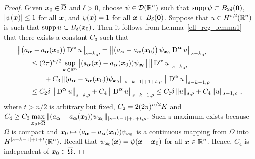 \begin{proof}
Given ${\bm{x}}_0 \in \overline{\Omega}$ and $\delta >0$,
choose $\displaystyle \psi \in \mathcal{D}(\mathbb{R}^n)$ such that
$\operatorname{supp} \psi \subset B_{2\delta}({\bm{0}})$, $|\psi({\bm{x}})|\leq 1$ for
all ${\bm{x}}$, and $\psi({\bm{x}}) = 1$ for all ${\bm{x}} \in B_\delta({\bm{0}})$.
Suppose that $\displaystyle u \in H^{s,2}(\mathbb{R}^n)$ is such that
$\displaystyle \operatorname{supp} u \subset B_\delta({\bm{x}}_0)$.
Then it follows from Lemma~\ref{ell_reg_lemma1} that there exists a
constant $C_3$ such that
\begin{align*}
&\left\| \big(a_{{\bm{\alpha}}} - a_{{\bm{\alpha}}}({\bm{x}}_0)\big)
\operatorname{D}^{{\bm{\alpha}}} u \right\|_{s-k,\rho}
= \left\| \big(a_{{\bm{\alpha}}} - a_{{\bm{\alpha}}}({\bm{x}}_0)\big)
\,\psi_{{\bm{x}}_0}\, \operatorname{D}^{{\bm{\alpha}}} u \right\|_{s-k,\rho} \\
&\qquad \leq (2\pi)^{n/2}
\sup_{{\bm{x}} \in \mathbb{R}^n} \big| (a_{{\bm{\alpha}}}({\bm{x}}) -
a_{{\bm{\alpha}}}({\bm{x}}_0)) \psi_{{\bm{x}}_0} \big|\,
\big\|\operatorname{D}^{{\bm{\alpha}}}  u\big\|_{s-k,\rho} \\
&\qquad \qquad
+ C_3 \left\|(a_{{\bm{\alpha}}} - a_{{\bm{\alpha}}}({\bm{x}}_0))
\psi_{{\bm{x}}_0}\right\|_{|s-k-1|+1+t,\rho}
\, \big\|\operatorname{D}^{{\bm{\alpha}}} u \big\|_{s-k-1,\rho} \\
&\qquad \leq C_2 \delta \, \big\|\operatorname{D}^{{\bm{\alpha}}} u\big\|_{s-k,\rho}
+ C_4 \, \big\|\operatorname{D}^{{\bm{\alpha}}} u \big\|_{s-k-1,\rho} 
\leq C_2 \delta \, \|u\|_{s,\rho}
+ C_4 \, \|u \|_{s-1,\rho}  \ ,
\end{align*}
where $t > n/2$ is arbitrary but fixed,
$\displaystyle C_2 = 2 (2\pi)^{n/2}K$ and \\
$\displaystyle C_4 \geq C_3 \max_{{\bm{x}}_0 \in \overline{\Omega}}
\|(a_{{\bm{\alpha}}} - a_{{\bm{\alpha}}}({\bm{x}}_0))
\psi_{{\bm{x}}_0}\|_{|s-k-1|+1+t,\rho}$.
Such a maximum exists because $\overline{\Omega}$ is compact
and ${\bm{x}}_0 \mapsto (a_{{\bm{\alpha}}} -
a_{{\bm{\alpha}}}({\bm{x}}_0))\psi_{{\bm{x}}_0}$
is a continuous mapping from $\overline{\Omega}$ into
$\displaystyle H^{|s-k-1|+1+t}(\mathbb{R}^n)$.  Recall that
$\psi_{{\bm{x}}_0}({\bm{x}}) = \psi({\bm{x}} - {\bm{x}}_0)$ for all
$\displaystyle {\bm{x}} \in \mathbb{R}^n$.
Hence, $C_4$ is independent of ${\bm{x}}_0 \in \overline{\Omega}$.


\end{proof}
